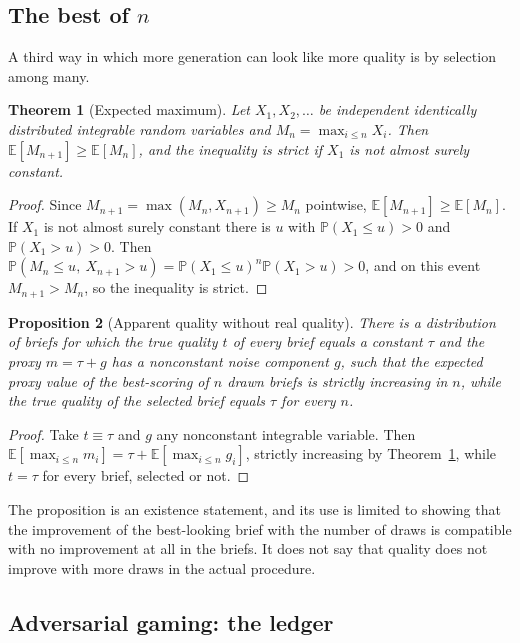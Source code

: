 \documentclass[11pt]{article}
\theoremstyle{plain}
\newtheorem{theorem}{Theorem}[section]
\newtheorem{proposition}[theorem]{Proposition}
\theoremstyle{definition}
\theoremstyle{remark}
\newcommand{\E}{\mathbb{E}}
\renewcommand{\Pr}{\mathbb{P}}
\begin{document}
\subsection{The best of $n$}

A third way in which more generation can look like more quality is by selection among many.

\begin{theorem}[Expected maximum]\label{thm:maxn}
Let $X_1,X_2,\ldots$ be independent identically distributed integrable random variables and $M_n=\max_{i\le n}X_i$. Then $\E[M_{n+1}]\ge\E[M_n]$, and the inequality is strict if $X_1$ is not almost surely constant.
\end{theorem}

\begin{proof}
Since $M_{n+1}=\max(M_n,X_{n+1})\ge M_n$ pointwise, $\E[M_{n+1}]\ge\E[M_n]$. If $X_1$ is not almost surely constant there is $u$ with $\Pr(X_1\le u)>0$ and $\Pr(X_1>u)>0$. Then $\Pr(M_n\le u,\ X_{n+1}>u)=\Pr(X_1\le u)^n\Pr(X_1>u)>0$, and on this event $M_{n+1}>M_n$, so the inequality is strict. \qedhere
\end{proof}

\begin{proposition}[Apparent quality without real quality]\label{prop:apparent}
There is a distribution of briefs for which the true quality $t$ of every brief equals a constant $\tau$ and the proxy $m=\tau+g$ has a nonconstant noise component $g$, such that the expected proxy value of the best-scoring of $n$ drawn briefs is strictly increasing in $n$, while the true quality of the selected brief equals $\tau$ for every $n$.
\end{proposition}

\begin{proof}
Take $t\equiv\tau$ and $g$ any nonconstant integrable variable. Then $\E[\max_{i\le n}m_i]=\tau+\E[\max_{i\le n}g_i]$, strictly increasing by Theorem~\ref{thm:maxn}, while $t=\tau$ for every brief, selected or not. \qedhere
\end{proof}

The proposition is an existence statement, and its use is limited to showing that the improvement of the best-looking brief with the number of draws is compatible with no improvement at all in the briefs. It does not say that quality does not improve with more draws in the actual procedure.

\subsection{Adversarial gaming: the ledger}
\end{document}
